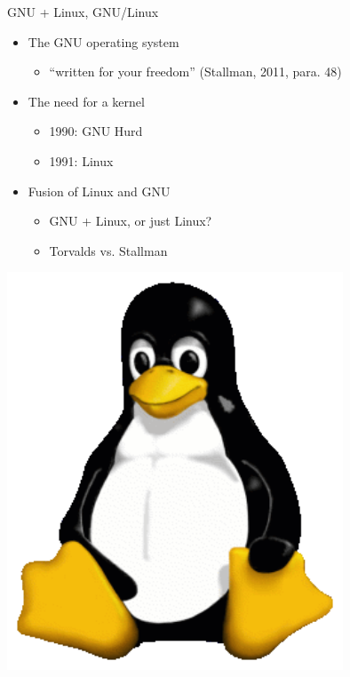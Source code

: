  


\begin{frame}{GNU + Linux, GNU/Linux}
\begin{minipage}{0.5\textwidth}
\begin{itemize}
  \item The GNU operating system
    \begin{itemize}
    \item ``written for your freedom'' (Stallman, 2011, para. 48) 
    \end{itemize}    
  \item The need for a kernel
    \begin{itemize}
      \item 1990: GNU Hurd
      \item 1991: Linux
     \end{itemize}
  \item Fusion of Linux and GNU
    \begin {itemize}
      \item GNU + Linux, or just Linux?
      \item Torvalds vs. Stallman
    \end{itemize}
\end{itemize}
\end{minipage}
\begin{minipage}{0.45\textwidth}
\includegraphics[width = 0.75\textwidth]{tux.png}

\end{minipage}
\end{frame}
